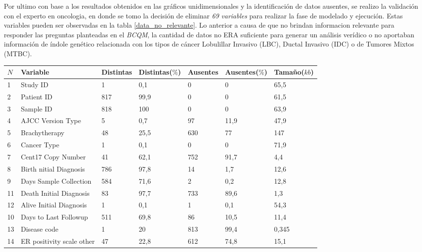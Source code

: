 Por ultimo con base a los resultados obtenidos en las gráficos unidimensionales  y  la identificación de datos ausentes, se realizo la validación con el experto en oncologia, en donde se tomo la decisión de eliminar \textit{69 variables} para realizar la fase de modelado y ejecución. Estas variables pueden ser observadas en la tabla \ref{data_no_relevante}. Lo anterior a causa de que no brindan informacion relevante para responder las preguntas planteadas en el \textit{BCQM}, la cantidad de datos no ERA suficiente para generar un análisis verídico o  no aportaban información de índole genético relacionada con los tipos de cáncer Lobulillar Invasivo (LBC), Ductal Invasivo (IDC) o de Tumores Mixtos (MTBC).

\begin{table}[!htb]
	\footnotesize
	\centering
	\begin{threeparttable}
		\begin{tabular}{p{0.5cm} p{4cm} p{1.5cm} p{2cm} p{1.5cm} p{2cm} p{1.5cm}} \toprule
			$N$  &Variable &Distintas &Distintas($\%$) &Ausentes &Ausentes($\%$)  &Tamaño($kb$)
			\\ \hline	1	&	Study ID	&	1	&	0,1	&	0	&	0	&	65,5
			\\ \hline	2	&	Patient ID	&	817	&	99,9	&	0	&	0	&	61,5
			\\ \hline	3	&	Sample ID	&	818	&	100	&	0	&	0	&	63,9
			\\ \hline	4	&	AJCC Version Type	&	5	&	0,7	&	97	&	11,9	&	47,9
			\\ \hline	5	&	Brachytherapy 	&	48	&	25,5	&	630	&	77	&	147
			\\ \hline	6	&	Cancer Type	&	1	&	0,1	&	0	&	0	&	71,9
			\\ \hline	7	&	Cent17 Copy Number	&	41	&	62,1	&	752	&	91,7	&	4,4
			\\ \hline	8	&	Birth nitial Diagnosis 	&	786	&	97,8	&	14	&	1,7	&	12,6
			\\ \hline	9	&	Days Sample Collection	&	584	&	71,6	&	2	&	0,2	&	12,8
			\\ \hline	11	&	Death Initial Diagnosis 	&	83	&	97,7	&	733	&	89,6	&	1,3
			\\ \hline	12	&	Alive Initial Diagnosis	&	1	&	0,1	&	1	&	0,1	&	54,3
			\\ \hline	10	&	Days to Last Followup	&	511	&	69,8	&	86	&	10,5	&	11,4
			\\ \hline	13	&	Disease code	&	1	&	20	&	813	&	99,4	&	0,345
			\\ \hline	14	&	ER positivity scale other	&	47	&	22,8	&	612	&	74,8	&	15,1

\end{tabular}
\end{threeparttable}
\end{table}
